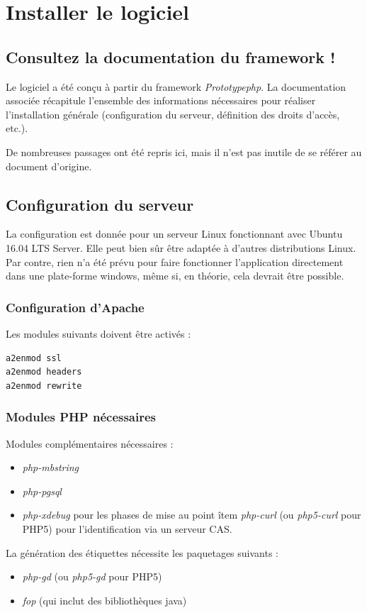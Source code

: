 \chapter{Installer le logiciel}

\section{Consultez la documentation du framework !}

Le logiciel a été conçu à partir du framework \textit{Prototypephp}. La documentation associée \cite{pphp-doc} récapitule l'ensemble des informations nécessaires pour réaliser l'installation générale (configuration du serveur, définition des droits d'accès, etc.).

De nombreuses passages ont été repris ici, mais il n'est pas inutile de se référer au document d'origine. 

\section{Configuration du serveur}
La configuration est donnée pour un serveur Linux fonctionnant avec Ubuntu 16.04 LTS Server. Elle peut bien sûr être adaptée à d'autres distributions Linux. Par contre, rien n'a été prévu pour faire fonctionner l'application directement dans une plate-forme windows, même si, en théorie, cela devrait être possible.

\subsection{Configuration d'Apache}
Les modules suivants doivent être activés :
\begin{lstlisting}
a2enmod ssl
a2enmod headers
a2enmod rewrite
\end{lstlisting}

\subsection{Modules PHP nécessaires}
Modules complémentaires nécessaires :
\begin{itemize}
\item \textit{php-mbstring}
\item \textit{php-pgsql}
\item \textit{php-xdebug} pour les phases de mise au point
îtem \textit{php-curl} (ou \textit{php5-curl} pour PHP5) pour l'identification via un serveur CAS.
\end{itemize}
La génération des étiquettes nécessite les paquetages suivants :
\begin{itemize}
\item \textit{php-gd} (ou \textit{php5-gd} pour PHP5)
\item \textit{fop} (qui inclut des bibliothèques java)
\end{itemize}

